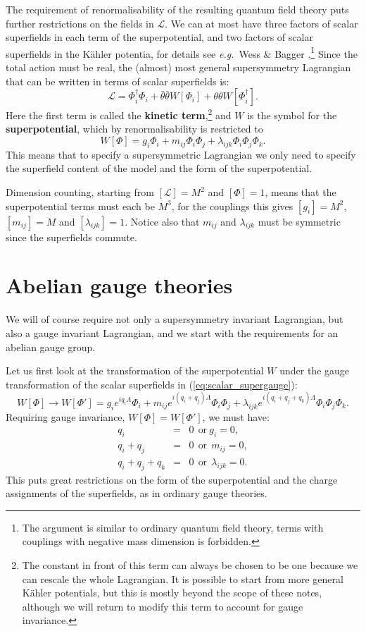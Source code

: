 \documentclass[notes.tex]{subfiles}
\begin{document}
The requirement of renormalisability of the resulting quantum field theory puts further restrictions on the fields in $\mathcal{L}$. We can at most have three factors of scalar superfields in each term of the superpotential, and two factors of scalar superfields in the Kähler potentia,  for details see {\it e.g.}\ Wess \& Bagger \cite{Bagger:1983mv}.\footnote{The argument is similar to ordinary quantum field theory, terms with couplings with negative mass dimension is forbidden.} 
Since the total action must be real, the (almost) most general supersymmetry Lagrangian that can be written in terms of scalar superfields is:
\[\mathcal{L} = \Phi^\dagger_i\Phi_i + \bar{\theta}\bar{\theta}W[\Phi_i] + \theta\theta W[\Phi^\dagger_i].\]
Here the first term is called the {\bf kinetic term},\footnote{The constant in front of this term can always be chosen to be one because we can rescale the whole Lagrangian. It is possible to start from more general Kähler potentials, but this is mostly beyond the scope of these notes, although we will return to modify this term to account for gauge invariance.} and $W$ is the symbol for the {\bf superpotential}, which by renormalisability is restricted to
\begin{equation}
W[\Phi] = g_i \Phi_i + m_{ij}\Phi_i \Phi_j + \lambda_{ijk} \Phi_i \Phi_j \Phi_k.
\end{equation}
This means that to specify a supersymmetric Lagrangian we only need to specify the superfield content of the model and the form of the superpotential. 

Dimension counting, starting from $[\mathcal{L}]=M^2$ and $[\Phi]=1$, means that the superpotential terms must each be $M^3$, for the couplings this gives $[g_i]=M^2$, $[m_{ij}]=M$ and $[\lambda_{ijk}]=1$. Notice also that $m_{ij}$ and $\lambda_{ijk}$ must be symmetric since the superfields commute.



\section[Albanian gauge theories]{Abelian gauge theories}
We will of course require not only a supersymmetry invariant Lagrangian, but also a gauge invariant Lagrangian, and we start with the requirements for an abelian gauge group. 

Let us first look at the transformation of the superpotential $W$ under the gauge transformation of the scalar superfields in (\ref{eq:scalar_supergauge}):
\[W[\Phi] \to W[\Phi'] = g_i e^{iq_i\Lambda }\Phi_i + m_{ij}e^{i(q_i+q_j)\Lambda}\Phi_i\Phi_j + \lambda_{ijk}e^{i(q_i+q_j+q_k)\Lambda}\Phi_i\Phi_j\Phi_k.\]
Requiring gauge invariance, $W[\Phi] = W[\Phi']$, we must have:
\begin{eqnarray}
q_i &=& 0 ~~\text{or}~g_i = 0, \\
q_i+q_j &=& 0 ~~\text{or}~~m_{ij} = 0,  \\
q_i+q_j+q_k &=& 0  ~~\text{or}~~ \lambda_{ijk}=0.
\end{eqnarray}
This puts great restrictions on the form of the superpotential and the charge assignments of the superfields, as in ordinary gauge theories. 
\end{document}

